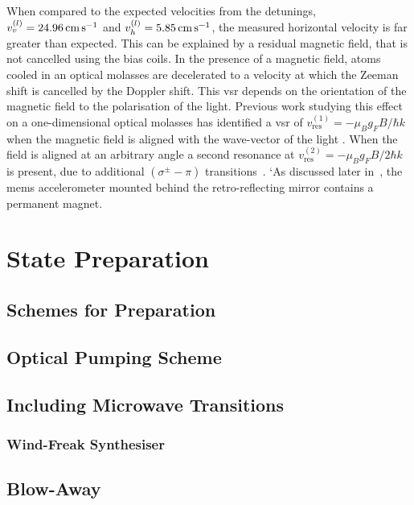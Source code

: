 \par\noindent
When compared to the expected velocities from the detunings, \(v^{(l)}_v = \sivalue{24.96}{\centi\metre\per\second}\) and  \(v^{(l)}_h = \sivalue{5.85}{\centi\metre\per\second}\), the measured horizontal velocity is far greater than expected. This can be explained by a residual magnetic field, that is not cancelled using the bias coils. In the presence of a magnetic field, atoms cooled in an optical molasses are decelerated to a velocity at which the Zeeman shift is cancelled by the Doppler shift. This \ac{vsr} depends on the orientation of the magnetic field to the polarisation of the light. Previous work studying this effect on a one-dimensional optical molasses has identified a \ac{vsr} of \(v_\text{res}^{(1)} = - \mu_B g_F B/\hbar k\) when the magnetic field is aligned with the wave-vector of the light \cite{VanderStraten1993}. When the field is aligned at an arbitrary angle a second resonance at \(v_\text{res}^{(2)} = - \mu_B g_F B/2\hbar k\) is present, due to additional \(\left(\sigma^{\pm}-\pi\right)\) transitions~\cite{Chang2002}. `As discussed later in~, the \ac{mems} accelerometer mounted behind the retro-reflecting mirror contains a permanent magnet.  

\section{State Preparation}\label{sec:state_prep}
\subsection{Schemes for Preparation}
\subsection{Optical Pumping Scheme} 
\subsection{Including Microwave Transitions}
\subsubsection{Wind-Freak Synthesiser}\label{subsec:windfreak}

\subsection{Blow-Away}\label{subsec:blow_away}